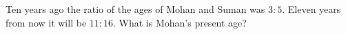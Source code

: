Ten years ago the ratio of the ages of Mohan and Suman was $3:5$. Eleven years from now it will be $11:16$. What is Mohan's present age?
